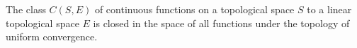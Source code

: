 The class $C(S,E)$ of continuous functions on a topological space $S$ to a linear topological space $E$ is closed in the space of all functions under the topology of uniform convergence.
